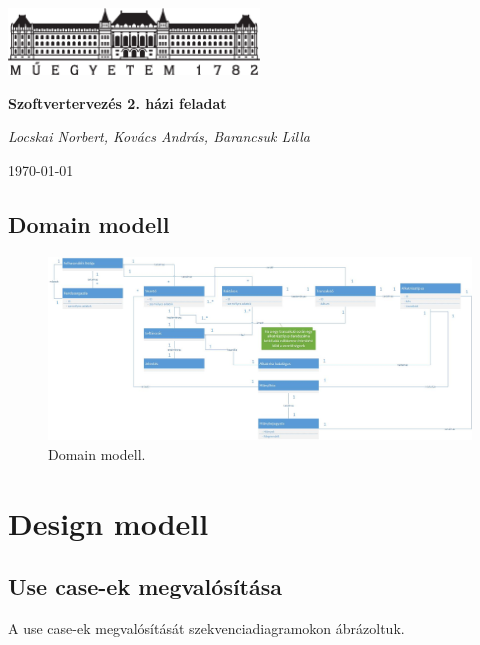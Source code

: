 \documentclass[12pt]{article}\usepackage[left=20mm,right=20mm,top=15mm,bottom=20mm]{geometry}
\begin{document}
\begin{titlepage}
\centering
	\includegraphics[width=0.5\textwidth]{figures/bme_logo_kicsi.eps}\par\vspace{1cm}
	\vspace{1cm}
	\vspace{1.5cm}
	{\huge\bfseries Szoftvertervezés 2. házi feladat \par}
	\vspace{15cm}
	{\huge\itshape Locskai Norbert, Kovács András, Barancsuk Lilla \par}
	\vfill

	{\large \today\par}
\end{titlepage}

\thispagestyle{empty}
\begin{landscape}
\section{Domain modell}
\begin{figure}[!h]
    \centering
        \includegraphics[width=1.4\textwidth]{kepek/Domain_model.jpg}
        \caption{Domain modell.}
\end{figure}
\end{landscape}

\section{Design modell}
\subsection{Use case-ek megvalósítása}
A use case-ek megvalósítását szekvenciadiagramokon ábrázoltuk.
\end{document}
